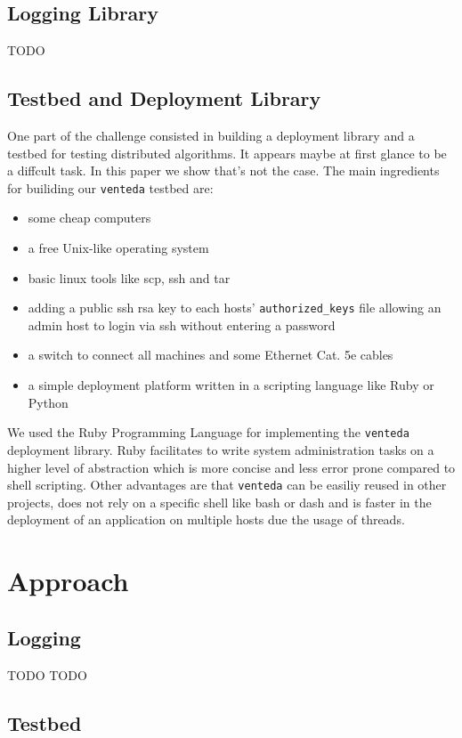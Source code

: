 \documentclass[10pt,a4wide]{article}
\begin{document}
\subsection{Logging Library}
TODO
\newpage

\subsection{Testbed and Deployment Library}
One part of the challenge consisted in building a deployment library and a testbed for testing distributed algorithms. It appears maybe at first glance to be a diffcult task. In this paper we show that's not the case. The main ingredients for builiding our \texttt{venteda} testbed are:
\begin{itemize}
\itemsep0em 
\item some cheap computers
\item a free Unix-like operating system
\item basic linux tools like scp, ssh and tar
\item adding a public ssh rsa key to each hosts' \texttt{authorized\_keys} file allowing an admin host to login via ssh without entering a password
\item a switch to connect all machines and some Ethernet Cat. 5e cables 
\item a simple deployment platform written in a scripting language like Ruby or Python
\end{itemize}
We used the Ruby Programming Language for implementing the \texttt{venteda} deployment library. Ruby facilitates to write system administration tasks on a higher level of abstraction which is more concise and less error prone compared to shell scripting. Other advantages are that \texttt{venteda} can be easiliy reused in other projects, does not rely on a specific shell like bash or dash and is faster in the deployment of an application on multiple hosts due the usage of threads.

\section{Approach}
\subsection{Logging}
TODO
\newpage
TODO
\newpage
\subsection{Testbed}
\end{document}
